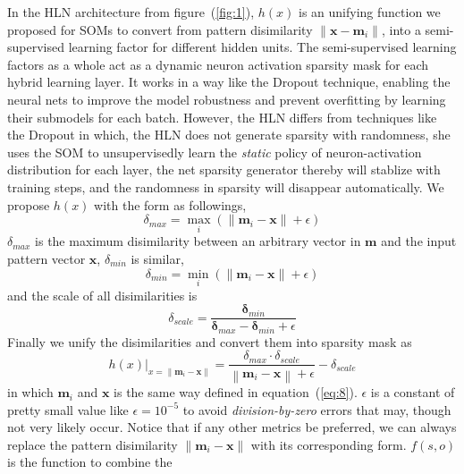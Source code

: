 \documentclass[3p,times,procedia]{elsarticle}
\begin{document}
In the HLN architecture from 
figure~(\ref{fig:1}),
$h(x)$ is an unifying function we proposed for 
SOMs to convert from pattern disimilarity
$\|\mathbf{x}-\mathbf{m}_i\|$, into
a semi-supervised learning factor for
different hidden units. The semi-supervised
learning factors as a whole act as a 
dynamic neuron activation sparsity mask for 
each hybrid learning layer.
It works in a way like the Dropout 
technique\cite{srivastava2014dropout}, 
enabling the neural nets 
to improve the model robustness and prevent
overfitting by learning their submodels for 
each batch. However, the HLN differs from 
techniques like the Dropout in which, 
the HLN does not generate sparsity with 
randomness, she uses the SOM
to unsupervisedly learn the \emph{static}
policy of neuron-activation distribution for
each layer, the net sparsity generator thereby
will stablize with training steps, and the
randomness in sparsity will disappear 
automatically.
We propose $h(x)$ with the form as followings,
\begin{equation}
	\delta_{max} = \max_i\left(
	\|\mathbf{m}_i-\mathbf{x}\|+\epsilon
	\right)
	\label{eq:10}
\end{equation}
$\delta_{max}$ is the maximum disimilarity
between an arbitrary vector in $\mathbf{m}$
and the input pattern vector $\mathbf{x}$,
$\delta_{min}$ is similar,
\begin{equation}
	\delta_{min} = \min_i\left(
	\|\mathbf{m}_i-\mathbf{x}\|+\epsilon
	\right)
	\label{eq:11}
\end{equation}
and the scale of all disimilarities is
\begin{equation}
	\delta_{scale} = 
	\frac{\mathbf{\delta}_{min}}
	{\mathbf{\delta}_{max}-
	\mathbf{\delta}_{min} + \epsilon}
	\label{eq:12}
\end{equation}
Finally we unify the disimilarities and convert
them into sparsity mask as
\begin{equation}
	h(x)|_{x=\|\mathbf{m}_i-\mathbf{x}\|}=
	\frac{\delta_{max}\cdot\delta_{scale}}
	{\left\|\mathbf{m}_i-\mathbf{x}\right\|
	+\epsilon}-\delta_{scale}
	\label{eq:13}
\end{equation}
in which $\mathbf{m}_i$ and $\mathbf{x}$ is the
same way defined in equation~(\ref{eq:8}).
$\epsilon$ is a constant of pretty small value
like $\epsilon=10^{-5}$ to avoid 
\emph{division-by-zero} errors that may, 
though not very likely occur. Notice that
if any other metrics be preferred, we can
always replace the pattern disimilarity
$\|\mathbf{m}_i-\mathbf{x}\|$ with its
corresponding form.
$f(s,o)$ is the function to combine the 
\end{document}
